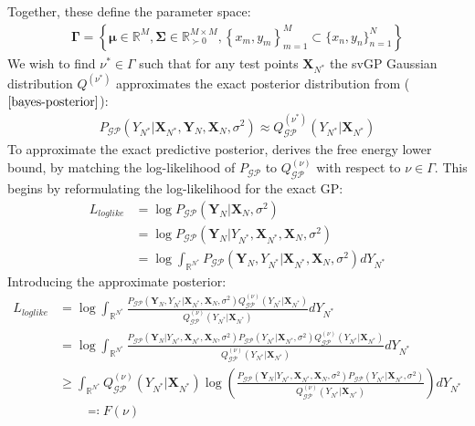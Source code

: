 \documentclass{article}
\newcommand{\GP}{\operatorname{\mathcal{GP}}}
\numberwithin{equation}{section}
\begin{document}
Together, these define the parameter space:
\begin{align}
    \mathbf{\Gamma} = \left\{\boldsymbol{\mu} \in \mathbb{R}^{M}, \mathbf{\Sigma} \in \mathbb{R}^{M\times M}_{\succ 0}, \left\{x_m, y_m\right\}_{m=1}^{M} \subset \{x_n, y_n\}_{n=1}^{N}\right\}
    \label{svgp-parameter-space}
\end{align}
We wish to find $\nu^* \in \Gamma$ such that for any test points $\mathbf{X}_{N^*}$ the svGP Gaussian distribution $Q^{(\nu^*)}$ approximates the exact posterior distribution from ($\ref{bayes-posterior}$):
\begin{align}
    P_{\GP}\left(Y_{N^*} \vert \mathbf{X}_{N^*}, \mathbf{Y}_N, \mathbf{X}_N, \sigma^2 \right) \approx Q_{\GP}^{(\nu^*)}\left(Y_{N^*} \vert \mathbf{X}_{N^*}\right)
    \label{svgp-desired-approximation}
\end{align}
To approximate the exact predictive posterior, \cite{titsias2009variational} derives the free energy lower bound, by matching the log-likelihood of $P_{\GP}$ to $Q^{(\nu)}_{\GP}$ with respect to $\nu \in \Gamma$. This begins by reformulating the log-likelihood for the exact GP:
\begin{align}
    L_{loglike} &= \log P_{\GP}\left(\mathbf{Y}_N \vert \mathbf{X}_N, \sigma^2\right)
    \\ &= \log P_{\GP}\left(\mathbf{Y}_N \vert Y_{N^*}, \mathbf{X}_{N^*}, \mathbf{X}_N, \sigma^2\right)
    \\ &= \log \int_{\mathbb{R}^{N^*}} P_{\GP}\left(\mathbf{Y}_N, Y_{N^*} \vert \mathbf{X}_{N^*}, \mathbf{X}_N, \sigma^2\right) d Y_{N^*}
    \label{log-like}
\end{align}
Introducing the approximate posterior:
\begin{align}
     L_{loglike} &= \log \int_{\mathbb{R}^{N^*}} \frac{P_{\GP}\left(\mathbf{Y}_N, Y_{N^*} \vert \mathbf{X}_{N^*}, \mathbf{X}_N, \sigma^2\right) Q^{(\nu)}_{\GP}(Y_{N^*} \vert \mathbf{X}_{N^*})}{Q^{(\nu)}_{\GP}(Y_{N^*} \vert \mathbf{X}_{N^*})} d Y_{N^*}
     \\ &= \log \int_{\mathbb{R}^{N^*}} \frac{P_{\GP}\left(\mathbf{Y}_N \vert Y_{N^*},  \mathbf{X}_{N^*}, \mathbf{X}_N, \sigma^2\right) P_{\GP}\left( Y_{N^*} \vert \mathbf{X}_{N^*}, \sigma^2\right) Q^{(\nu)}_{\GP}(Y_{N^*} \vert \mathbf{X}_{N^*})}{Q^{(\nu)}_{\GP}(Y_{N^*} \vert \mathbf{X}_{N^*})} d Y_{N^*}
     \\ & \geq \int_{\mathbb{R}^{N^*}} Q^{(\nu)}_{\GP}(Y_{N^*} \vert \mathbf{X}_{N^*}) \log \left(\frac{P_{\GP}\left(\mathbf{Y}_N \vert Y_{N^*},  \mathbf{X}_{N^*}, \mathbf{X}_N, \sigma^2\right) P_{\GP}\left( Y_{N^*} \vert \mathbf{X}_{N^*}, \sigma^2\right) }{Q^{(\nu)}_{\GP}(Y_{N^*} \vert \mathbf{X}_{N^*})}\right) d Y_{N^*}
     \label{elbo-jensen}
     \\ & \qquad \eqqcolon F(\nu)
     \label{elbo-definition}
\end{align}
\end{document}
